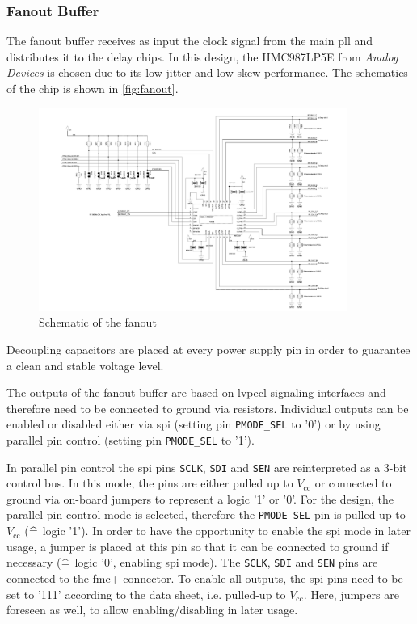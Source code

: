 \subsubsection*{Fanout Buffer}
The fanout buffer receives as input the clock signal from the main \gls{pll} and distributes it to the delay chips.
In this design, the HMC987LP5E from \textit{Analog Devices} is chosen due to its low jitter and low skew performance. 
The schematics of the chip is shown in \autoref{fig:fanout}.
\begin{figure}[H]
	\centering
	\includegraphics[width = 0.9\textwidth]{chap/04-theresa/img/schematic/fanout}
	\caption{Schematic of the fanout}
	\label{fig:fanout}
\end{figure}
Decoupling capacitors are placed at every power supply pin in order to guarantee a clean and stable voltage level.

The outputs of the fanout buffer are based on \gls{lvpecl} signaling interfaces and therefore need to be connected to ground via resistors.
Individual outputs can be enabled or disabled either via \gls{spi} (setting pin \texttt{PMODE\_SEL} to '0') or by using parallel pin control (setting pin \texttt{PMODE\_SEL} to '1'). 

In parallel pin control the \gls{spi} pins \texttt{SCLK}, \texttt{SDI} and \texttt{SEN} are reinterpreted as a 3-bit control bus.
In this mode, the pins are either pulled up to $V_\text{cc}$ or connected to ground via on-board jumpers to represent a logic '1' or '0'.
For the design, the parallel pin control mode is selected, therefore the \texttt{PMODE\_SEL} pin is pulled up to $V_\text{cc}$ ($\mathrel{\widehat{=}}$ logic '1').
In order to have the opportunity to enable the \gls{spi} mode in later usage, a jumper is placed at this pin so that it can be connected to ground if necessary ($\mathrel{\widehat{=}}$ logic '0', enabling \gls{spi} mode).
The \texttt{SCLK}, \texttt{SDI} and \texttt{SEN} pins are connected to the \gls{fmc}+ connector.
To enable all outputs, the \gls{spi} pins need to be set to '111' according to the data sheet, i.e. pulled-up to $V_\text{cc}$. 
Here, jumpers are foreseen as well, to allow enabling/disabling in later usage.

